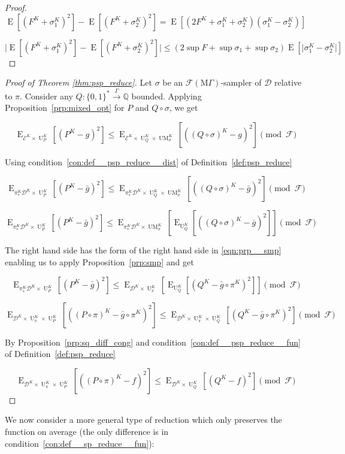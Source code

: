 \documentclass{article}
\numberwithin{equation}{section}
\theoremstyle{definition}
\theoremstyle{plain}
\newcommand{\Bool}{\{0,1\}}
\newcommand{\Words}{{\Bool^*}}
\DeclareMathOperator{\E}{E}
\DeclareMathOperator{\UM}{UM}
\DeclareMathOperator{\Un}{U}
\newcommand{\Rats}{\mathbb{Q}}
\newcommand{\Abs}[1]{\lvert #1 \rvert}
\newcommand{\Dist}{\mathcal{D}}
\newcommand{\MGrow}{\mathrm{M}\Gamma}
\newcommand{\Fall}{\mathcal{F}}
\newcommand{\EMG}{\Fall(\MGrow)}
\newcommand{\Scheme}{\xrightarrow{\Gamma}}
\begin{document}
\begin{proof}

\[\E[(F^K + \sigma_1^K)^2] - \E[(F^K + \sigma_2^K)^2] = \E[(2 F^K + \sigma_1^K + \sigma_2^K)(\sigma_1^K - \sigma_2^K)]\]

\[\Abs{\E[(F^K + \sigma_1^K)^2] - \E[(F^K + \sigma_2^K)^2]} \leq (2 \sup F + \sup \sigma_1 + \sup \sigma_2) \E[\Abs{\sigma_1^K - \sigma_2^K}]\]
%
\end{proof}

\begin{proof}[Proof of Theorem \ref{thm:psp_reduce}]

Let ${\sigma}$ be an ${\EMG}$-sampler of ${\Dist}$ relative to ${\pi}$. Consider any ${Q: \Words \Scheme \Rats}$ bounded. Applying Proposition~\ref{prp:mixed_opt} for ${P}$ and ${Q \circ \sigma}$, we get

\[\E_{\mathcal{E}^{K} \times \Un_P^K}[(P^K-g)^2] \leq \E_{\mathcal{E}^{K} \times \Un_Q^K \times \UM_\sigma^K}[((Q \circ \sigma)^K - g)^2] \pmod \Fall\]

Using condition~\ref{con:def__psp_reduce__dist} of Definition~\ref{def:psp_reduce}

\[\E_{\pi_*^K\Dist^{K} \times \Un_P^K}[(P^K-\bar{g})^2] \leq \E_{\pi_*^K\Dist^{K} \times \Un_Q^K \times \UM_\sigma^K}[((Q \circ \sigma)^K - \bar{g})^2] \pmod \Fall\]

\[\E_{\pi_*^K\Dist^{K} \times \Un_P^K}[(P^K-\bar{g})^2] \leq \E_{\pi_*^K\Dist^{K} \times \UM_\sigma^K}[\E_{\Un_Q^K}[((Q \circ \sigma)^K - \bar{g})^2]] \pmod \Fall\]

The right hand side has the form of the right hand side in \ref{eqn:prp__smp} enabling us to apply Proposition~\ref{prp:smp} and get

\[\E_{\pi_*^K\Dist^{K} \times \Un_P^K}[(P^K-\bar{g})^2] \leq \E_{\Dist^{K} \times \Un_\pi^K}[\E_{\Un_Q^K}[(Q^K - \bar{g} \circ \pi^K)^2]] \pmod \Fall\]

\[\E_{\Dist^{K} \times \Un_\pi^K \times \Un_P^K}[((P \circ \pi)^K-\bar{g} \circ \pi^K)^2] \leq \E_{\Dist^{K} \times \Un_\pi^K \times \Un_Q^K}[(Q^K - \bar{g} \circ \pi^K)^2] \pmod \Fall\]

By Proposition~\ref{prp:sq_diff_cong} and condition~\ref{con:def__psp_reduce__fun} of Definition~\ref{def:psp_reduce}

\[\E_{\Dist^{K} \times \Un_\pi^K \times \Un_P^K}[((P \circ \pi)^K-f)^2] \leq \E_{\Dist^{K} \times \Un_Q^K}[(Q^K - f)^2] \pmod \Fall\]
%
\end{proof}

We now consider a more general type of reduction which only preserves the function on average (the only difference is in condition~\ref{con:def__sp_reduce__fun}):
\end{document}
